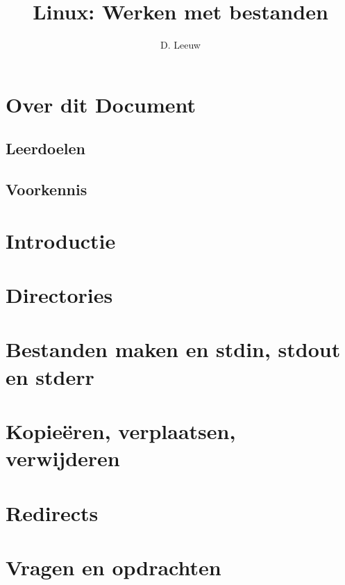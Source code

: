 \documentclass[a4paper,12pt,twoside,openright,titlepage]{article}
\author{D. Leeuw}
\title{Linux: Werken met bestanden}
\date{\today\\
1.0.0\\
\vfill
\raggedright
\copyright\ 2020-2025 Dennis Leeuw\\
}
\begin{document}

\maketitle


\section{Over dit Document}
\subsection{Leerdoelen}

\subsection{Voorkennis}



\section{Introductie}

\section{Directories}


\section{Bestanden maken en stdin, stdout en stderr}

\section{Kopie\"eren, verplaatsen, verwijderen}

\section{Redirects}

\section{Vragen en opdrachten}


\printindex
\end{document}
